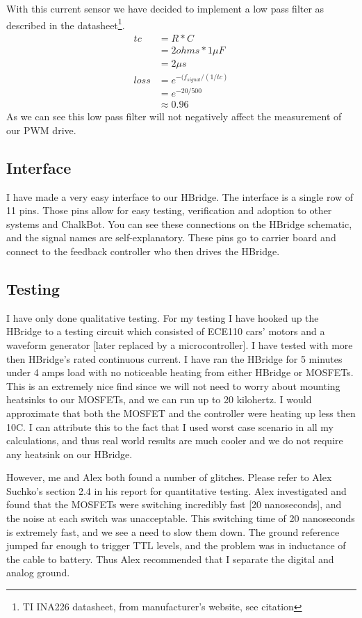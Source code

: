 \documentclass[12pt]{article}
\begin{document}
With this current sensor we have decided to implement a low pass filter as described in the datasheet\footnote{TI INA226 datasheet, from manufacturer's website, see citation}. 
\begin{align}
tc &= R* C
\\&= 2 ohms * 1 \mu F
\\&= 2 \mu s
\\loss &= e^{-(f_{signal} / (1/tc)}
\\&=e^{-20/500}
\\&\approx0.96
\end{align}
As we can see this low pass filter will not negatively affect the measurement of our PWM drive.
\subsection{Interface}
I have made a very easy interface to our HBridge. The interface is a single row of 11 pins. Those pins allow for easy testing, verification and adoption to other systems and ChalkBot. You can see these connections on the HBridge schematic, and the signal names are self-explanatory.  These pins go to carrier board and connect to the feedback controller who then drives the HBridge. 
\subsection{Testing}
I have only done qualitative testing. For my testing I have hooked up the HBridge to a testing circuit which consisted of ECE110 cars' motors and a waveform generator [later replaced by a microcontroller]. I have tested with more then HBridge's rated continuous current. I have ran the HBridge for 5 minutes under 4 amps load with no noticeable heating from either HBridge or MOSFETs. This is an extremely nice find since we will not need to worry about mounting heatsinks to our MOSFETs, and we can run up to 20 kilohertz. I would approximate that both the MOSFET and the controller were heating up less then 10C.  I can attribute this to the fact that I used worst case scenario in all my calculations, and thus real world results are much cooler and we do not require any heatsink on our HBridge.

However, me and Alex both found a number of glitches. Please refer to Alex Suchko's section 2.4 in his report for quantitative testing. Alex investigated and found that the MOSFETs were switching incredibly fast [20 nanoseconds], and the noise at each switch was unacceptable. This switching time of 20 nanoseconds is extremely fast, and we see a need to slow them down. The ground reference jumped far enough to trigger TTL levels, and the problem was in inductance of the cable to battery.  Thus Alex recommended that I separate the digital and analog ground.
\end{document}
